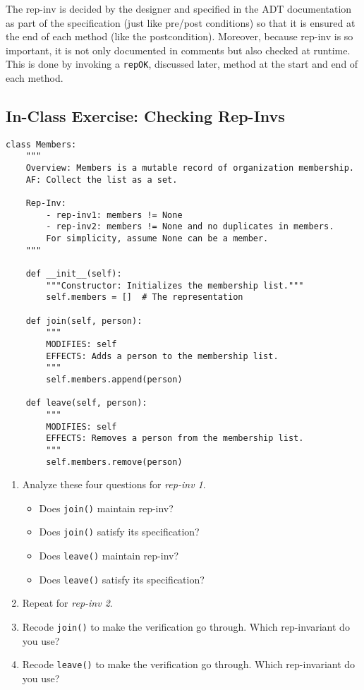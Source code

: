 \documentclass[oneside,11pt,dvipsnames]{book}
\newcommand{\code}[1]{\texttt{#1}}
\begin{document}
The rep-inv is decided by the designer and specified in the ADT documentation as part of the specification (just like pre/post conditions) so that it is ensured at the end of each method (like the postcondition). Moreover, because rep-inv is so important, it is not only documented in comments but also checked at runtime.  This is done by invoking a \code{repOK}, discussed later, method at the start and end of each method.

\subsection{In-Class Exercise: Checking Rep-Invs}

\begin{lstlisting}
class Members:
    """
    Overview: Members is a mutable record of organization membership.
    AF: Collect the list as a set.
    
    Rep-Inv:
        - rep-inv1: members != None
        - rep-inv2: members != None and no duplicates in members.
        For simplicity, assume None can be a member.
    """

    def __init__(self):
        """Constructor: Initializes the membership list."""
        self.members = []  # The representation

    def join(self, person):
        """
        MODIFIES: self
        EFFECTS: Adds a person to the membership list.
        """
        self.members.append(person)

    def leave(self, person):
        """
        MODIFIES: self
        EFFECTS: Removes a person from the membership list.
        """
        self.members.remove(person)
\end{lstlisting}

\begin{enumerate}
\item Analyze these four questions for \emph{rep-inv 1}.
\begin{itemize}
    \item Does \code{join()} maintain rep-inv?
    \item Does \code{join()} satisfy its specification?
    \item Does \code{leave()} maintain rep-inv?
    \item Does \code{leave()} satisfy its specification?
\end{itemize}
\item Repeat for \emph{rep-inv 2}.
\item Recode \code{join()} to make the verification go through. Which rep-invariant do you use?
\item Recode \code{leave()} to make the verification go through. Which rep-invariant do you use?
\end{enumerate}
\end{document}
